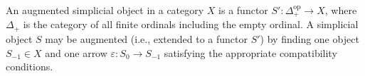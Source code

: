 An augmented simplicial object in a category $X$ is a functor $S' : \Delta_+^{\text{op}} \rightarrow X$, where $\Delta_+$ is the category of all finite ordinals including the empty ordinal. A simplicial object $S$ may be augmented (i.e., extended to a functor $S'$) by finding one object $S_{-1} \in X$ and one arrow $\varepsilon : S_0 \rightarrow S_{-1}$ satisfying the appropriate compatibility conditions.
